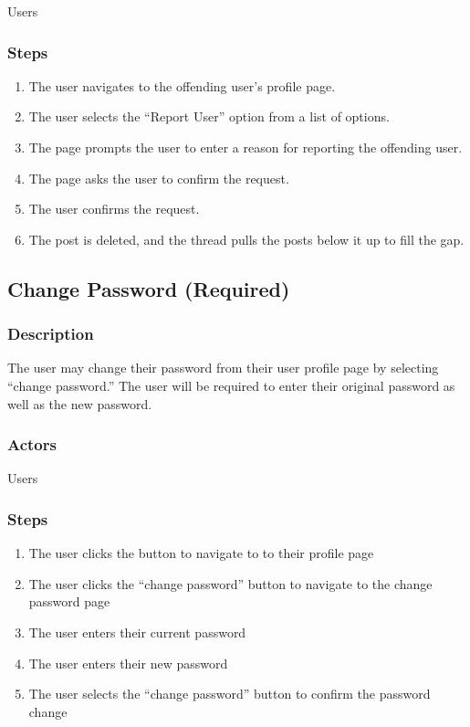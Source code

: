 \documentclass[12pt]{scrartcl}
\begin{document}
Users

\subsubsection{Steps}

\begin{enumerate}
\item The user navigates to the offending user’s profile page.
\item The user selects the “Report User” option from a list of options.
\item The page prompts the user to enter a reason for reporting the offending user.
\item The page asks the user to confirm the request.
\item The user confirms the request.
\item The post is deleted, and the thread pulls the posts below it up to fill the gap.
\end{enumerate}


\subsection{Change Password (Required)}
\subsubsection{Description}

The user may change their password from their user profile page by selecting “change password.” The user will be required to enter their original password as well as the new password.

\subsubsection{Actors}

Users

\subsubsection{Steps}

\begin{enumerate}
\item The user clicks the button to navigate to to their profile page
\item The user clicks the “change password” button to navigate to the change password page
\item The user enters their current password
\item The user enters their new password
\item The user selects the “change password” button to confirm the password change
\end{enumerate}
\end{document}
